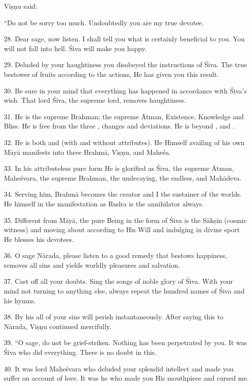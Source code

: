 Viṣṇu said:

“Do not be sorry too much. Undoubtedly you are my true devotee.

28. Dear sage, now listen. I shall tell you what is certainly beneficial to you.
You will not fall into hell. Śiva will make you happy.

29. Deluded by your haughtiness you disobeyed the instructions of Śiva. The true
bestower of fruits according to the actions, He has given you this result.

30. Be sure in your mind that everything has happened in accordance with Śiva’s
wish. That lord Śiva, the supreme lord, removes haughtiness.

31. He is the supreme Brahman; the supreme Ātman, Existence, Knowledge and
Bliss. He is free from the three , changes and deviations. He is
beyond ,  and .

32. He is both  and  (with and without attributes). He
Himself availing of his own Māyā manifests into three Brahmā, Viṣṇu, and
Maheśa.

33. In his attributeless pure form He is glorified as Śiva, the supreme Ātman,
Maheśvara, the supreme Brahman, the undecaying, the endless, and Mahādeva.

34. Serving him, Brahmā becomes the creator and I the sustainer of the worlds.
He himself in the manifestation as Rudra is the annihilator always.

35. Different from Māyā, the pure Being in the form of Śiva is the Sākṣin
(cosmic witness) and moving about according to His Will and indulging in divine
sport He blesses his devotees.

36. O sage Nārada, please listen to a good remedy that bestows happiness,
removes all sins and yields worldly pleasures and salvation.

37. Cast off all your doubts. Sing the songs of noble glory of Śiva. With your
mind not turning to anything else, always repeat the hundred names of Śiva and
his hymns.

38. By his  all of your sins will perish instantaneously. After saying
this to Nārada, Viṣṇu continued mercifully.

39. “O sage, do not be grief-striken. Nothing has been perpetrated by you. It
was Śiva who did everything. There is no doubt in this.

40. It was lord Maheśvara who deluded your splendid intellect and made you
suffer on account of love. It was he who made you His mouthpiece and cursed me.


